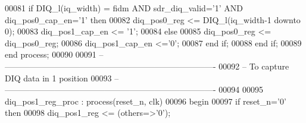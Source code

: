\begin{DoxyCode}
00081             \textcolor{keywordflow}{if} \textcolor{vhdlchar}{DIQ_l}\textcolor{vhdlchar}{(}\textcolor{vhdlchar}{iq_width}\textcolor{vhdlchar}{)} \textcolor{vhdlchar}{=} \textcolor{vhdlchar}{fidm} \textcolor{keywordflow}{AND} \textcolor{vhdlchar}{sdr_diq_valid}\textcolor{vhdlchar}{=}\textcolor{vhdlchar}{'}\textcolor{vhdllogic}{}\textcolor{vhdllogic}{1}\textcolor{vhdlchar}{'} \textcolor{keywordflow}{AND} \textcolor{vhdlchar}{diq_pos0_cap_en}\textcolor{vhdlchar}{=}\textcolor{vhdlchar}{'}\textcolor{vhdllogic}{}\textcolor{vhdllogic}{1}\textcolor{vhdlchar}{'} \textcolor{keywordflow}{then} 
00082             \textcolor{vhdlchar}{diq_pos0_reg}        \textcolor{vhdlchar}{<=} \textcolor{vhdlchar}{DIQ_l}\textcolor{vhdlchar}{(}\textcolor{vhdlchar}{iq_width}\textcolor{vhdlchar}{-}\textcolor{vhdllogic}{}\textcolor{vhdllogic}{1} \textcolor{keywordflow}{downto} \textcolor{vhdllogic}{}\textcolor{vhdllogic}{0}\textcolor{vhdlchar}{)};
00083                 \textcolor{vhdlchar}{diq_pos1_cap_en} \textcolor{vhdlchar}{<=} \textcolor{vhdlchar}{'}\textcolor{vhdllogic}{}\textcolor{vhdllogic}{1}\textcolor{vhdlchar}{'};
00084             \textcolor{keywordflow}{else} 
00085                 \textcolor{vhdlchar}{diq_pos0_reg}    \textcolor{vhdlchar}{<=} \textcolor{vhdlchar}{diq_pos0_reg};
00086                 \textcolor{vhdlchar}{diq_pos1_cap_en} \textcolor{vhdlchar}{<=}\textcolor{vhdlchar}{'}\textcolor{vhdllogic}{}\textcolor{vhdllogic}{0}\textcolor{vhdlchar}{'};
00087             \textcolor{keywordflow}{end} \textcolor{keywordflow}{if}; 
00088         \textcolor{keywordflow}{end} \textcolor{keywordflow}{if};
00089     \textcolor{keywordflow}{end} \textcolor{keywordflow}{process};
00090 
00091 \textcolor{keyword}{-- ----------------------------------------------------------------------------}
00092 \textcolor{keyword}{-- To capture DIQ data in 1 position}
00093 \textcolor{keyword}{-- ----------------------------------------------------------------------------}
00094 
00095  diq\_pos1\_reg\_proc : \textcolor{keywordflow}{process}(reset_n, clk)
00096 \textcolor{vhdlkeyword}{    begin}
00097       \textcolor{keywordflow}{if} \textcolor{vhdlchar}{reset_n}\textcolor{vhdlchar}{=}\textcolor{vhdlchar}{'}\textcolor{vhdllogic}{}\textcolor{vhdllogic}{0}\textcolor{vhdlchar}{'} \textcolor{keywordflow}{then}
00098          \textcolor{vhdlchar}{diq_pos1_reg} \textcolor{vhdlchar}{<=} \textcolor{vhdlchar}{(}\textcolor{keywordflow}{others}\textcolor{vhdlchar}{=}\textcolor{vhdlchar}{>}\textcolor{vhdlchar}{'}\textcolor{vhdllogic}{}\textcolor{vhdllogic}{0}\textcolor{vhdlchar}{'}\textcolor{vhdlchar}{)};

\end{DoxyCode}
